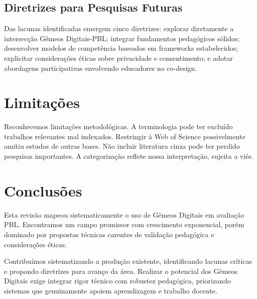 \documentclass[english, spanish, brazilian]{RBIEarticle} %
\begin{document}
\subsection{Diretrizes para Pesquisas Futuras}

Das lacunas identificadas emergem cinco diretrizes: explorar diretamente a intersecção Gêmeos Digitais-PBL; integrar fundamentos pedagógicos sólidos; desenvolver modelos de competência baseados em frameworks estabelecidos; explicitar considerações éticas sobre privacidade e consentimento; e adotar abordagens participativas envolvendo educadores no co-design.

\section{Limitações}

Reconhecemos limitações metodológicas. A terminologia pode ter excluído trabalhos relevantes mal indexados. Restringir à Web of Science possivelmente omitiu estudos de outras bases. Não incluir literatura cinza pode ter perdido pesquisas importantes. A categorização reflete nossa interpretação, sujeita a viés.

\section{Conclusões}

Esta revisão mapeou sistematicamente o uso de Gêmeos Digitais em avaliação PBL. Encontramos um campo promissor com crescimento exponencial, porém dominado por propostas técnicas carentes de validação pedagógica e considerações éticas.

Contribuímos sistematizando a produção existente, identificando lacunas críticas e propondo diretrizes para avanço da área. Realizar o potencial dos Gêmeos Digitais exige integrar rigor técnico com robustez pedagógica, priorizando sistemas que genuinamente apoiem aprendizagem e trabalho docente.


\printbibliography
\end{document}

